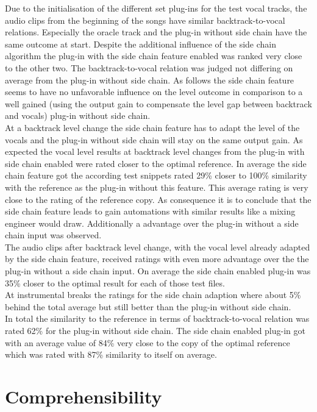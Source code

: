 Due to the initialisation of the different set plug-ins for the test vocal tracks, the audio clips from the beginning of the songs have similar backtrack-to-vocal relations. Especially the oracle track and the plug-in without side chain have the same outcome at start. Despite the additional influence of the side chain algorithm the plug-in with the side chain feature enabled was ranked very close to the other two. The backtrack-to-vocal relation was judged not differing on average from the plug-in without side chain. As follows the side chain feature seems to have no unfavorable influence on the level outcome in comparison to a well gained (using the output gain to compensate the level gap between backtrack and vocals) plug-in without side chain.\\
At a backtrack level change the side chain feature has to adapt the level of the vocals and the plug-in without side chain will stay on the same output gain. As expected the vocal level results at backtrack level changes from the plug-in with side chain enabled were rated closer to the optimal reference. In average the side chain feature got the according test snippets rated 29\% closer to 100\% similarity with the reference as the plug-in without this feature. This average rating is very close to the rating of the reference copy. As consequence it is to conclude that the side chain feature leads to gain automations with similar results like a mixing engineer would draw. Additionally a advantage over the plug-in without a side chain input was observed.\\
The audio clips after backtrack level change, with the vocal level already adapted by the side chain feature, received ratings with even more advantage over the the plug-in without a side chain input. On average the side chain enabled plug-in was 35\% closer to the optimal result for each of those test files.\\
At instrumental breaks the ratings for the side chain adaption where about 5\% behind the total average but still better than the plug-in without side chain.\\
In total the similarity to the reference in terms of backtrack-to-vocal relation was rated 62\% for the plug-in without side chain. The side chain enabled plug-in got with an average value of 84\% very close to the copy of the optimal reference which was rated with 87\% similarity to itself on average.\\

\section{Comprehensibility}

